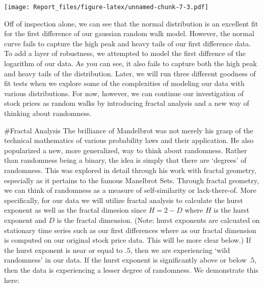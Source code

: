 \documentclass[]{article}
\begin{document}
\texttt{[image: Report\_files/figure-latex/unnamed-chunk-7-3.pdf]}

Off of inspection alone, we can see that the normal distribution is an
excellent fit for the first difference of our gaussian random walk
model. However, the normal curve fails to capture the high peak and
heavy tails of our first difference data. To add a layer of robustness,
we attempted to model the first diffrence of the logarithm of our data.
As you can see, it also fails to capture both the high peak and heavy
tails of the distribution. Later, we will run three different goodness
of fit tests when we explore some of the complexities of modeling our
data with various distributions. For now, however, we can continue our
investigation of stock prices as random walks by introducing fractal
analysis and a new way of thinking about randomness.

\#Fractal Analysis The brilliance of Mandelbrot was not merely his grasp
of the technical mathematics of various probability laws and their
application. He also popularized a new, more generalized, way to think
about randomness. Rather than randomness being a binary, the idea is
simply that there are `degrees' of randomness. This was explored in
detail through his work with fractal geometry, especially as it pertains
to the famous Manelbrot Sets. Through fractal geometry, we can think of
randomness as a measure of self-similarity or lack-there-of. More
specifically, for our data we will utilize fractal analysis to calculate
the hurst exponent as well as the fractal dimesion since \(H = 2 - D\)
where \(H\) is the hurst exponent and \(D\) is the fractal dimension.
(Note: hurst exponents are calcuated on stationary time series such as
our first differences where as our fractal dimension is computed on our
original stock price data. This will be more clear below.) If the hurst
exponent is near or equal to \(.5\), then we are experiencing `wild
randomness' in our data. If the hurst exponent is significantly above or
below \(.5\), then the data is experiencing a lesser degree of
randomness. We demonstrate this here:
\end{document}
